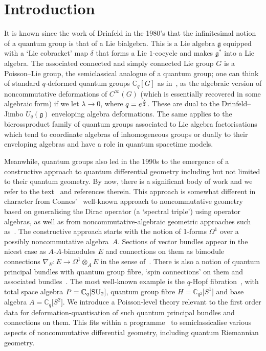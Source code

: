 \documentclass[pdftex]{sigma}
\numberwithin{equation}{section}
\newcommand{\C}{{\mathbb{C}}}
\newcommand{\<}{{\langle}}
\renewcommand{\>}{{\rangle}}
\newcommand{\tens}{\otimes}
\newcommand{\cg}{{\mathfrak{g}}}
\begin{document}
\section{Introduction}
It is known since the work of Drinfeld in the 1980's \cite{Dri:ham,Drinfeld} that the infinitesimal notion of a quantum group is that of a Lie bialgebra. This is a Lie algebra $\mathfrak{g}$ equipped with a `Lie cobracket' map $\delta$ that forms a Lie $1$-cocycle and makes $\mathfrak{g}^*$ into a Lie algebra. The associated connected and simply connected Lie group $G$ is a Poisson--Lie group, the semiclassical analogue of a quantum group; one can think of standard $q$-deformed quantum groups $\C_q[G]$ as in~\cite{FRT}, as the algebraic version of noncommutative deformations of $C^\infty(G)$ (which is essentially recovered in some algebraic form) if we let $\lambda\to 0$, where $q=e^{\lambda\over 2}$. These are dual to the Drinfeld--Jimbo $U_q(\cg)$ enveloping algebra deformations. The same applies to the bicrossproduct family of quantum groups associated to Lie algebra factorisations~\cite{Ma:book} which tend to coordinate algebras of inhomogeneous groups or dually to their enveloping algebras and have a role in quantum spacetime models.

Meanwhile, quantum groups also led in the 1990s to the emergence of a constructive approach to quantum differential geometry including but not limited to their quantum geometry. By now, there is a significant body of work and we refer to the text~\cite{BegMa} and references therein. This approach is somewhat different in character from Connes'~\cite{Con} well-known approach to noncommutative geometry based on generalising the Dirac operator (a `spectral triple') using operator algebras, as well as from noncommutative-algebraic geometric approaches such as~\cite{SvdB}. The constructive approach starts with the notion of 1-forms $\Omega^1$ over a possibly noncommutative algebra~$A$. Sections of vector bundles appear in the nicest case as $A$-$A$-bimodules $E$ and connections on them as bimodule connections $\nabla_E\colon E\to \Omega^1\tens_A E$ in the sense of~\cite{DVM,Mou}. There is also a notion of quantum principal bundles with quantum group fibre, `spin connections' on them and associated bundles~\cite{BrzMa}. The most well-known example is the $q$-Hopf fibration~\cite{BegMa, BrzMa,HajMa,Ma:spin}, with total space algebra $P=\C_q[{\rm SU}_2]$, quantum group fibre $H=\C_{q^2}\big[S^1\big]$ and base algebra $A=\C_q\big[S^2\big]$. We introduce a Poisson-level theory relevant to the first order data for deformation-quantisation of such quantum principal bundles and connections on them. This fits within a programme~\cite{BegMa:sem, BegMa:prg, FriMa,MaTao:plg} to semiclassicalise various aspects of noncommutative differential geometry, including quantum Riemannian geometry.
\end{document}
